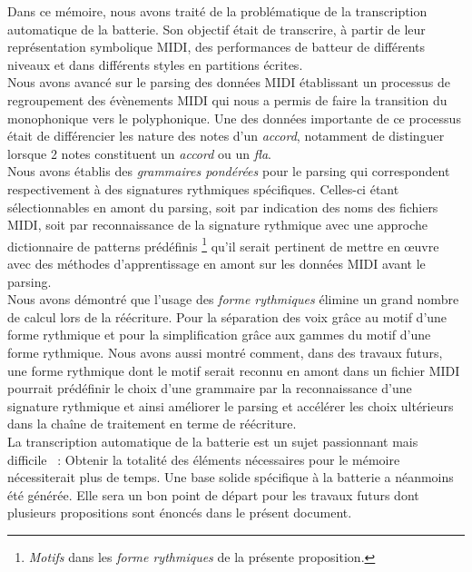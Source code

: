 Dans ce mémoire, nous avons traité de la problématique de la transcription
automatique de la batterie. Son objectif était de transcrire, à partir de leur
représentation symbolique MIDI, des performances de batteur de différents
niveaux et dans différents styles en partitions écrites.\\

Nous avons avancé sur le parsing des données MIDI établissant un processus de
regroupement des évènements MIDI qui nous a permis de faire la transition du
monophonique vers le polyphonique. Une des données importante de ce processus
était de différencier les nature des notes d’un \textit{accord}, notamment de
distinguer lorsque 2 notes constituent un \textit{accord} ou un \textit{fla}.\\
Nous avons établis des \textit{grammaires pondérées} pour le parsing qui
correspondent respectivement à des signatures rythmiques spécifiques. Celles-ci
étant sélectionnables en amont du parsing, soit par indication des noms des
fichiers MIDI, soit par reconnaissance de la signature rythmique avec une approche dictionnaire de
patterns prédéfinis \footnote{\textit{Motifs} dans les \textit{forme rythmiques} de la
présente proposition.} qu’il serait pertinent de mettre en œuvre avec des
méthodes d’apprentissage en amont sur les données MIDI avant le parsing.\\
Nous avons démontré que l’usage des \textit{forme rythmiques} élimine un grand nombre
de calcul lors de la réécriture. Pour la séparation des voix grâce au motif
d’une forme rythmique et pour la simplification grâce aux gammes du motif d’une forme rythmique.
Nous avons aussi montré comment, dans des travaux futurs, une forme rythmique dont le
motif serait reconnu en amont dans un fichier MIDI pourrait prédéfinir le choix
d’une grammaire par la reconnaissance d’une signature rythmique et ainsi améliorer le
parsing et accélérer les choix ultérieurs dans la chaîne de traitement en terme
de réécriture.\\

La transcription automatique de la batterie est un sujet passionnant mais
difficile~ : Obtenir la totalité des éléments nécessaires pour le mémoire
nécessiterait plus de temps. Une base solide spécifique à la batterie a
néanmoins été générée. Elle sera un bon point de départ pour les travaux futurs
dont plusieurs propositions sont énoncés dans le présent document.
